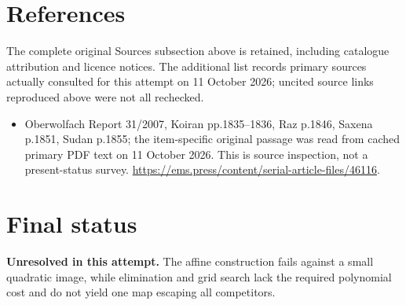 \documentclass[11pt]{article}
\begin{document}
\section{References}
The complete original Sources subsection above is retained, including catalogue attribution and licence notices. The additional list records primary sources actually consulted for this attempt on 11 October 2026; uncited source links reproduced above were not all rechecked.
\begin{itemize}
\item Oberwolfach Report 31/2007, Koiran pp.1835--1836, Raz p.1846, Saxena p.1851, Sudan p.1855; the item-specific original passage was read from cached primary PDF text on 11 October 2026. This is source inspection, not a present-status survey. \url{https://ems.press/content/serial-article-files/46116}.
\end{itemize}
\section{Final status}
\textbf{Unresolved in this attempt.} The affine construction fails against a small quadratic image, while elimination and grid search lack the required polynomial cost and do not yield one map escaping all competitors.
\end{document}
